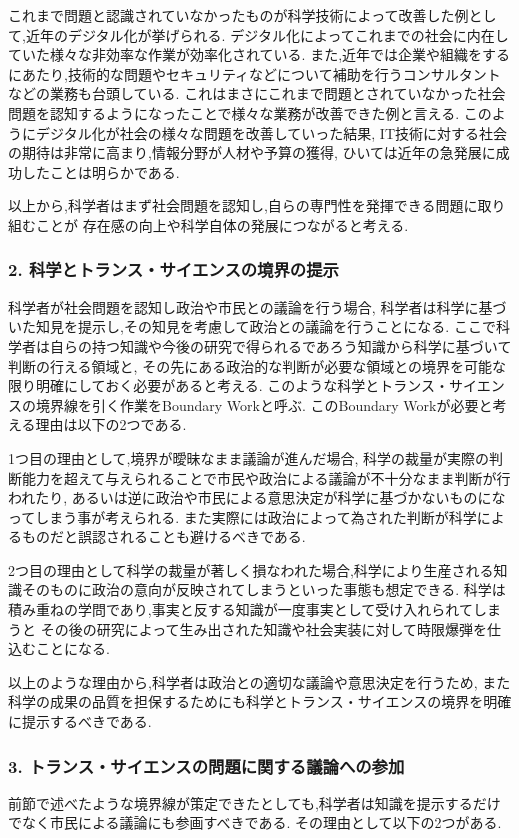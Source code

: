 \documentclass[uplatex,a4j,11pt,dvipdfmx]{jsarticle}
\begin{document}
これまで問題と認識されていなかったものが科学技術によって改善した例として,近年のデジタル化が挙げられる.
デジタル化によってこれまでの社会に内在していた様々な非効率な作業が効率化されている.
また,近年では企業や組織をするにあたり,技術的な問題やセキュリティなどについて補助を行うコンサルタントなどの業務も台頭している.
これはまさにこれまで問題とされていなかった社会問題を認知するようになったことで様々な業務が改善できた例と言える.
このようにデジタル化が社会の様々な問題を改善していった結果,
IT技術に対する社会の期待は非常に高まり,情報分野が人材や予算の獲得,
ひいては近年の急発展に成功したことは明らかである.

以上から,科学者はまず社会問題を認知し,自らの専門性を発揮できる問題に取り組むことが
存在感の向上や科学自体の発展につながると考える.
\subsubsection*{2. 科学とトランス・サイエンスの境界の提示}
科学者が社会問題を認知し政治や市民との議論を行う場合,
科学者は科学に基づいた知見を提示し,その知見を考慮して政治との議論を行うことになる.
ここで科学者は自らの持つ知識や今後の研究で得られるであろう知識から科学に基づいて判断の行える領域と,
その先にある政治的な判断が必要な領域との境界を可能な限り明確にしておく必要があると考える.
このような科学とトランス・サイエンスの境界線を引く作業をBoundary Workと呼ぶ.\cite{trans:online}
このBoundary Workが必要と考える理由は以下の2つである.

1つ目の理由として,境界が曖昧なまま議論が進んだ場合,
科学の裁量が実際の判断能力を超えて与えられることで市民や政治による議論が不十分なまま判断が行われたり,
あるいは逆に政治や市民による意思決定が科学に基づかないものになってしまう事が考えられる.
また実際には政治によって為された判断が科学によるものだと誤認されることも避けるべきである.

2つ目の理由として科学の裁量が著しく損なわれた場合,科学により生産される知識そのものに政治の意向が反映されてしまうといった事態も想定できる.
科学は積み重ねの学問であり,事実と反する知識が一度事実として受け入れられてしまうと
その後の研究によって生み出された知識や社会実装に対して時限爆弾を仕込むことになる.

以上のような理由から,科学者は政治との適切な議論や意思決定を行うため,
また科学の成果の品質を担保するためにも科学とトランス・サイエンスの境界を明確に提示するべきである.
\subsubsection*{3. トランス・サイエンスの問題に関する議論への参加}
前節で述べたような境界線が策定できたとしても,科学者は知識を提示するだけでなく市民による議論にも参画すべきである.
その理由として以下の2つがある.
\end{document}
